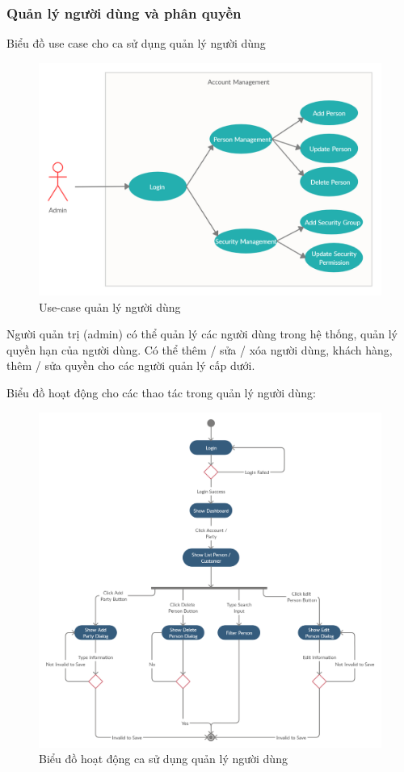 \subsubsection{Quản lý người dùng và phân quyền}
Biểu đồ use case cho ca sử dụng quản lý người dùng

\begin{figure}[H]
\centering
\includegraphics[width=12cm]{images/use-case/account-management.jpg}
\caption{Use-case quản lý người dùng}
\end{figure}

Người quản trị (admin) có thể quản lý các người dùng trong
hệ thống, quản lý quyền hạn của người dùng. Có thể thêm / sửa /
xóa người dùng, khách hàng, thêm / sửa quyền cho các người
quản lý cấp dưới.


Biểu đồ hoạt động cho các thao tác trong quản lý người dùng:
\begin{figure}[H]
\centering
\includegraphics[width=15cm]
{images/activity-diagram/account-management.png}
\caption{Biểu đồ hoạt động ca sử dụng quản lý người dùng}
\end{figure}

